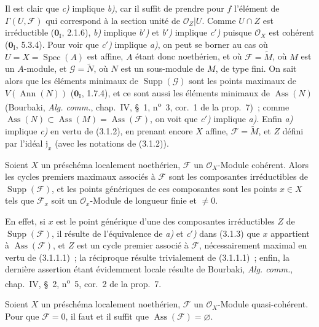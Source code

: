 Il est clair que \emph{c)} implique \emph{b)}, car il suffit de prendre pour
$f$ l'élément de $\Gamma(U,\mathcal F)$ qui correspond à la section unité de
$\mathcal O_Z|U$. Comme $U\cap Z$ est irréductible ($\mathbf{0}_{\mathrm I}$, 2.1.6),
\emph{b)} implique \emph{b$'$)} et \emph{b$'$)} implique \emph{c$'$)} puisque
$\mathcal O_X$ est cohérent ($\mathbf{0}_{\mathrm I}$, 5.3.4). Pour voir que
\emph{c$'$)} implique \emph{a)}, on peut se borner au cas où
$U=X=\operatorname{Spec}(A)$ est affine, $A$ étant donc noethérien, et où
$\mathcal F=\widetilde M$, où $M$ est un $A$-module, et
$\mathcal G=\widetilde N$, où $N$ est un sous-module de $M$, de type fini.
On sait alors que les éléments minimaux de $\operatorname{Supp}(\mathcal G)$
sont les points maximaux de $V(\operatorname{Ann}(N))$ ($\mathbf{0}_{\mathrm I}$, 1.7.4),
et ce sont aussi les éléments minimaux de $\operatorname{Ass}(N)$ (Bourbaki,
\emph{Alg. comm.}, chap.~IV, \S~1, n\textsuperscript{o}~3, cor.~1 de la
prop.~7)~; comme $\operatorname{Ass}(N)\subset\operatorname{Ass}(M)
=\operatorname{Ass}(\mathcal F)$, on voit que \emph{c$'$)} implique
\emph{a)}. Enfin \emph{a)} implique \emph{c)} en vertu de (3.1.2), en
prenant encore $X$ affine, $\mathcal F=\widetilde M$, et $Z$ défini par
l'idéal $\mathfrak j_x$ (avec les notations de (3.1.2)).

\begin{corollary}[3.1.4]
\label{IV.2.3.1.4-fr}
Soient $X$ un préschéma localement noethérien, $\mathcal F$ un
$\mathcal O_X$-Module cohérent. Alors les cycles premiers maximaux associés à
$\mathcal F$ sont les composantes irréductibles de
$\operatorname{Supp}(\mathcal F)$, et les points génériques de ces composantes
sont les points $x\in X$ tels que $\mathcal F_x$ soit un
$\mathcal O_x$-Module de longueur finie et $\ne0$.
\end{corollary}

En effet, si $x$ est le point générique d'une des composantes irréductibles
$Z$ de $\operatorname{Supp}(\mathcal F)$, il résulte de l'équivalence de
\emph{a)} et \emph{c$'$)} dans (3.1.3) que $x$ appartient à
$\operatorname{Ass}(\mathcal F)$, et $Z$ est un cycle premier associé à
$\mathcal F$, nécessairement maximal en vertu de (3.1.1.1)~; la réciproque
résulte trivialement de (3.1.1.1)~; enfin, la dernière assertion étant
évidemment locale résulte de Bourbaki, \emph{Alg. comm.}, chap.~IV, \S~2,
n\textsuperscript{o}~5, cor.~2 de la prop.~7.

\begin{corollary}[3.1.5]
Soient $X$ un préschéma localement noethérien, $\mathcal F$ un
$\mathcal O_X$-Module quasi-cohérent. Pour que $\mathcal F=0$, il faut et il
suffit que $\operatorname{Ass}(\mathcal F)=\varnothing$.
\end{corollary}

